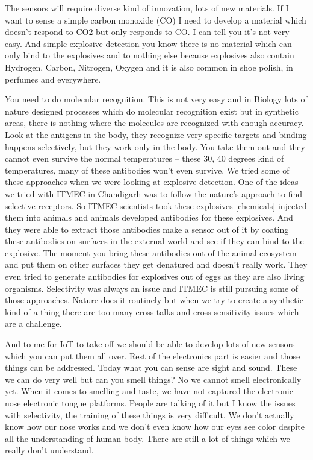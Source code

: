 The sensors will require diverse kind of innovation, lots of new materials. If I want to sense a simple carbon monoxide (CO) I need to develop a material which doesn’t respond to CO2 but only responds to CO. I can tell you it’s not very easy.  And simple explosive detection you know there is no material which can only bind to the explosives and to nothing else because explosives also contain Hydrogen, Carbon, Nitrogen, Oxygen and it is also common in shoe polish, in perfumes and everywhere.

You need to do molecular recognition. This is not very easy and in Biology lots of nature designed processes which do molecular recognition exist but in synthetic areas, there is nothing where the molecules are recognized with enough accuracy.  Look at the antigens in the body, they recognize very specific targets and binding happens selectively, but they work only in the body. You take them out and they cannot even survive the normal temperatures -- these 30, 40 degrees kind of temperatures, many of these antibodies won’t even survive. We tried some of these approaches when we were looking at explosive detection. One of the ideas we tried with ITMEC in Chandigarh was to follow the nature’s approach to find selective receptors. So ITMEC scientists took these explosives [chemicals] injected them into animals and animals developed antibodies for these explosives. And they were able to extract those antibodies make a sensor out of it by coating these antibodies on surfaces in the external world and see if they can bind to the explosive.  The moment you bring these antibodies out of the animal ecosystem and put them on other surfaces they get denatured and doesn’t really work. They even tried to generate antibodies for explosives out of eggs as they are also living organisms.  Selectivity was always an issue and ITMEC is still pursuing some of those approaches. Nature does it routinely but when we try to create a synthetic kind of a thing there are too many cross-talks and cross-sensitivity issues which are a challenge.

And to me for IoT to take off we should be able to develop lots of new sensors which you can put them all over. Rest of the electronics part is easier and those things can be addressed. Today what you can sense are sight and sound. These we can do very well but can you smell things? No we cannot smell electronically yet. When it comes to smelling and taste, we have not captured the electronic nose electronic tongue platforms.  People are talking of it but I know the issues with selectivity, the training of these things is very difficult. We don’t actually know how our nose works and we don’t even know how our eyes see color despite all the understanding of human body. There are still a lot of things which we really don’t understand.

